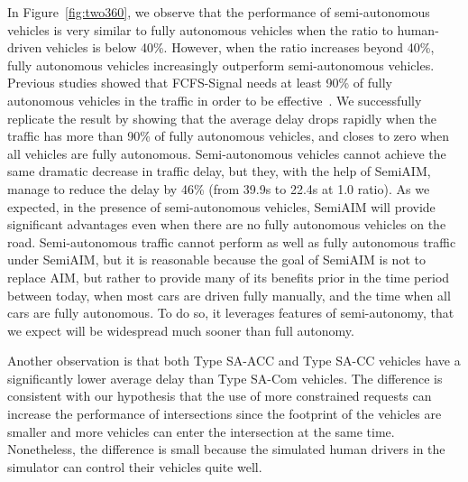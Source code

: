 In Figure~\ref{fig:two360}, we observe that the performance of
semi-autonomous vehicles is very similar to fully autonomous vehicles
when the ratio to human-driven vehicles is below 40\%.  However, when
the ratio increases beyond 40\%, fully autonomous vehicles
increasingly outperform semi-autonomous vehicles.  Previous studies
showed that FCFS-Signal needs at least 90\% of fully autonomous
vehicles in the traffic in order to be
effective~\cite{bib:Dresner07Sharing}.  We successfully replicate the
result by showing that the average delay drops rapidly when the
traffic has more than 90\% of fully autonomous vehicles, and closes to
zero when all vehicles are fully autonomous.  Semi-autonomous vehicles
cannot achieve the same dramatic decrease in traffic delay, but they,
with the help of SemiAIM, manage to reduce the delay by 46\% (from
39.9s to 22.4s at 1.0 ratio).  As we expected, in the presence of
semi-autonomous vehicles, SemiAIM will provide significant advantages
even when there are no fully autonomous vehicles on the road.
Semi-autonomous traffic cannot perform as well as fully autonomous
traffic under SemiAIM, but it is reasonable because the goal of
SemiAIM is not to replace AIM, but rather to provide many of its
benefits prior in the time period between today, when most cars are
driven fully manually, and the time when all cars are fully
autonomous.  To do so, it leverages features of semi-autonomy, that we
expect will be widespread much sooner than full autonomy.

Another observation is that both Type SA-ACC and Type SA-CC vehicles
have a significantly lower average delay than Type SA-Com vehicles.
The difference is consistent with our hypothesis that the use of more
constrained requests can increase the performance of intersections
since the footprint of the vehicles are smaller and more vehicles can
enter the intersection at the same time.  Nonetheless, the difference
is small because the simulated human drivers in the simulator can
control their vehicles quite well.





